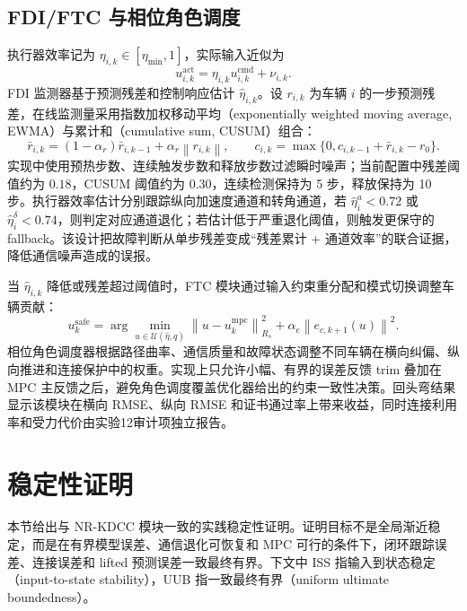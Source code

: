 \documentclass[twocolumn,3p,times,procedia]{elsarticle}
\newcommand{\Method}{NR-KDCC}
\newcommand{\norm}[1]{\left\lVert #1 \right\rVert}
\begin{document}
\subsection{FDI/FTC 与相位角色调度}

执行器效率记为 $\eta_{i,k}\in[\eta_{\min},1]$，实际输入近似为
\begin{equation}
u_{i,k}^{\mathrm{act}}=\eta_{i,k}u_{i,k}^{\mathrm{cmd}}+\nu_{i,k}.
\label{eq:actuator_efficiency}
\end{equation}
FDI 监测器基于预测残差和控制响应估计 $\hat\eta_{i,k}$。设 $r_{i,k}$ 为车辆 $i$ 的一步预测残差，在线监测量采用指数加权移动平均（exponentially weighted moving average, EWMA）与累计和（cumulative sum, CUSUM）组合：
\begin{equation}
\bar r_{i,k}=(1-\alpha_r)\bar r_{i,k-1}+\alpha_r\norm{r_{i,k}},\qquad
c_{i,k}=\max\{0,c_{i,k-1}+\bar r_{i,k}-r_0\}.
\label{eq:fdi_ewma_cusum}
\end{equation}
实现中使用预热步数、连续触发步数和释放步数过滤瞬时噪声；当前配置中残差阈值约为 $0.18$，CUSUM 阈值约为 $0.30$，连续检测保持为 5 步，释放保持为 10 步。执行器效率估计分别跟踪纵向加速度通道和转角通道，若 $\hat\eta^a_i<0.72$ 或 $\hat\eta^\delta_i<0.74$，则判定对应通道退化；若估计低于严重退化阈值，则触发更保守的 fallback。该设计把故障判断从单步残差变成“残差累计 + 通道效率”的联合证据，降低通信噪声造成的误报。

当 $\hat\eta_{i,k}$ 降低或残差超过阈值时，FTC 模块通过输入约束重分配和模式切换调整车辆贡献：
\begin{equation}
u_k^\mathrm{safe}=\arg\min_{u\in\mathcal U(\hat\eta,q)}
\norm{u-u_k^\mathrm{mpc}}_{R_s}^2+
\alpha_e\norm{e_{c,k+1}(u)}^2 .
\label{eq:ftc_projection}
\end{equation}
相位角色调度器根据路径曲率、通信质量和故障状态调整不同车辆在横向纠偏、纵向推进和连接保护中的权重。实现上只允许小幅、有界的误差反馈 trim 叠加在 MPC 主反馈之后，避免角色调度覆盖优化器给出的约束一致性决策。回头弯结果显示该模块在横向 RMSE、纵向 RMSE 和证书通过率上带来收益，同时连接利用率和受力代价由实验12审计项独立报告。

\section{稳定性证明}

本节给出与 \Method{} 模块一致的实践稳定性证明。证明目标不是全局渐近稳定，而是在有界模型误差、通信退化可恢复和 MPC 可行的条件下，闭环跟踪误差、连接误差和 lifted 预测误差一致最终有界。下文中 ISS 指输入到状态稳定（input-to-state stability），UUB 指一致最终有界（uniform ultimate boundedness）。
\end{document}
